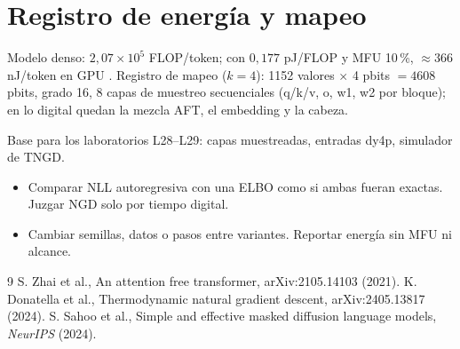 \documentclass[11pt,a4paper]{article}
\begin{document}
\section{Registro de energía y mapeo}
Modelo denso: $2{,}07\times10^5$ FLOP/token; con $0{,}177$ pJ/FLOP y MFU 10\,\%, $\approx366$ nJ/token en GPU \evE. Registro de mapeo ($k=4$): 1152 valores $\times$ 4 pbits
$=4608$ pbits, grado 16, 8 capas de muestreo secuenciales (q/k/v, o, w1, w2 por bloque); en lo digital quedan la mezcla AFT, el embedding y la cabeza.

\begin{aplicacion}
Base para los laboratorios L28--L29: capas muestreadas, entradas dy4p, simulador de TNGD.
\end{aplicacion}

\begin{error}
\begin{itemize}[nosep]
\item Comparar NLL autoregresiva con una ELBO como si ambas fueran exactas. \quad Juzgar NGD solo por tiempo digital.
\item Cambiar semillas, datos o pasos entre variantes. \quad Reportar energía sin MFU ni alcance.
\end{itemize}
\end{error}

\begin{thebibliography}{9}\small
{} S. Zhai et al., An attention free transformer, arXiv:2105.14103 (2021).
 K. Donatella et al., Thermodynamic natural gradient descent, arXiv:2405.13817 (2024).
 S. Sahoo et al., Simple and effective masked diffusion language models, \emph{NeurIPS} (2024).
\end{thebibliography}
\end{document}
